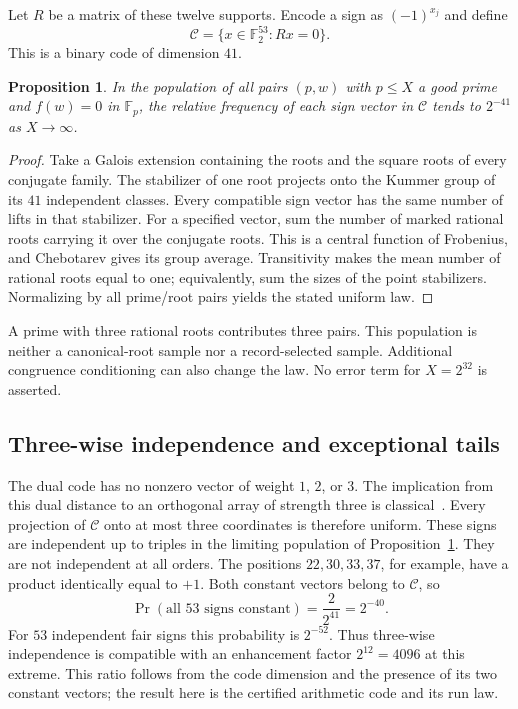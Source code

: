 \documentclass[11pt]{article}
\newtheorem{proposition}[theorem]{Proposition}
\theoremstyle{definition}\newtheorem{definition}[theorem]{Definition}
\newcommand{\Fp}{\mathbb F_p}
\newcommand{\Ftwo}{\mathbb F_2}
\newcommand{\Prob}{\operatorname{Pr}}
\begin{document}
Let $R$ be a matrix of these twelve supports. Encode a sign as
$(-1)^{x_j}$ and define
\[
 \mathcal C=\{x\in\Ftwo^{53}:Rx=0\}.
\]
This is a binary code of dimension $41$.
\begin{proposition}\label{prop:uniformcode}
In the population of all pairs $(p,w)$ with $p\le X$ a good prime
and $f(w)=0$ in $\Fp$, the relative frequency of each sign vector
in $\mathcal C$ tends to $2^{-41}$ as $X\to\infty$.
\end{proposition}
\begin{proof}
Take a Galois extension containing the roots and the square roots
of every conjugate family. The stabilizer of one root projects
onto the Kummer group of its $41$ independent classes. Every
compatible sign vector has the same number of lifts in that
stabilizer. For a specified vector, sum the number of marked
rational roots carrying it over the conjugate roots. This is a
central function of Frobenius, and Chebotarev gives its group
average. Transitivity makes the mean number of rational roots
equal to one; equivalently, sum the sizes of the point stabilizers.
Normalizing by all prime/root pairs yields the stated uniform law.
\end{proof}
A prime with three rational roots contributes three pairs. This
population is neither a canonical-root sample nor a record-selected
sample. Additional congruence conditioning can also change the law.
No error term for $X=2^{32}$ is asserted.

\subsection{Three-wise independence and exceptional tails}
The dual code has no nonzero vector of weight $1$, $2$, or $3$.
The implication from this dual distance to an orthogonal array of
strength three is classical~\cite{delsarte,cameron}.
Every projection of $\mathcal C$ onto at most three coordinates is
therefore uniform. These signs are independent up to triples in
the limiting population of Proposition~\ref{prop:uniformcode}.
They are not independent at all orders. The positions
$22,30,33,37$, for example, have a product identically equal to $+1$.
Both constant vectors belong to $\mathcal C$, so
\[
 \Prob(\text{all 53 signs constant})=
 \frac2{2^{41}}=2^{-40}.
\]
For $53$ independent fair signs this probability is $2^{-52}$.
Thus three-wise independence is compatible with an enhancement
factor $2^{12}=4096$ at this extreme. This ratio follows from the
code dimension and the presence of its two constant vectors;
the result here is the certified arithmetic code and its run law.
\end{document}
